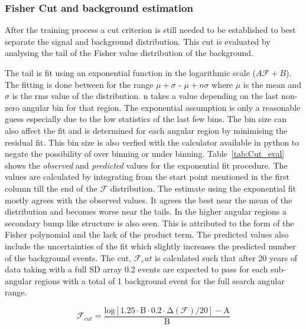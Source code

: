 \subsubsection{Fisher Cut and background estimation}
\label{subsubsec:nu_sel_fisher_cut}
After the training process a cut criterion is still needed to be established to best separate the signal and background distribution. This cut is evaluated by analysing the tail of the Fisher value distribution of the background. 

The tail is fit using an exponential function in the logarithmic scale ($A \mathcal{F} + B$). The fitting is done between for the range $\mu + \sigma$ - $\mu + n\sigma$ where $\mu$ is the mean and $\sigma$ is the rms value of the distribution. n takes a value depending on the last non-zero angular bin for that region. The exponential assumption is only a reasonable guess especially due to the low statistics of the last few bins. The bin size can also affect the fit and is determined for each angular region by minimising the residual fit. This bin size is also verfied with the calculator available in python to negate the possibility of over binning or under binning. Table~\ref{tab:Cut_eval} shows the \textit{observed} and \textit{predicted} values for the exponential fit procedure. The values are calculated by integrating from the start point mentioned in the first column till the end of the $\mathcal{F}$ distribution. The estimate using the exponential fit mostly agrees with the observed values. It agrees the best near the mean of the distribution and becomes worse near the tails. In the higher angular regions a secondary bump like structure is also seen. This is attributed to the form of the Fisher polynomial and the lack of the product term. The predicted values also include the uncertainties of the fit which slightly increases the predicted number of the background events. The cut, $\mathcal{F}_cut$ is calculated such that after 20 years of data taking with a full SD array 0.2 events are expected to pass for each sub-angular regions with a total of 1 background event for the full search angular range. 

\begin{equation}
  \label{eq:fisher_poly_cut}
  \mathcal{F}_{cut} = \mathrm{\frac{log[1.25 \cdot B \cdot 0.2 \cdot \Delta (\mathcal{F}) / 20] - A}{B} }
\end{equation}

